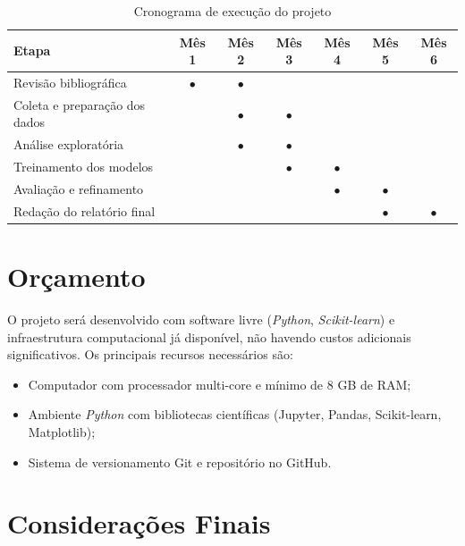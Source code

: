 \documentclass[
    article,
    12pt,
    oneside,
    a4paper,
    english,
    brazilian
    ]{abntex2}
\numberwithin{equation}{section}
\begin{document}
\begin{table}[htbp]
\centering
\caption{Cronograma de execução do projeto}
\label{tab:cronograma}
\small
\begin{tabular}{p{5.2cm}cccccc}
\toprule
\textbf{Etapa} & \textbf{Mês 1} & \textbf{Mês 2} & \textbf{Mês 3} & \textbf{Mês 4} & \textbf{Mês 5} & \textbf{Mês 6} \\
\midrule
Revisão bibliográfica         & $\bullet$ & $\bullet$ & & & & \\
Coleta e preparação dos dados & & $\bullet$ & $\bullet$ & & & \\
Análise exploratória          & & $\bullet$ & $\bullet$ & & & \\
Treinamento dos modelos       & & & $\bullet$ & $\bullet$ & & \\
Avaliação e refinamento       & & & & $\bullet$ & $\bullet$ & \\
Redação do relatório final    & & & & & $\bullet$ & $\bullet$ \\
\bottomrule
\end{tabular}
\vspace{2mm}
\end{table}

\section{Orçamento}

O projeto será desenvolvido com software livre (\textit{Python}, \textit{Scikit-learn}) e infraestrutura computacional já disponível, não havendo custos adicionais significativos. Os principais recursos necessários são:

\begin{itemize}
    \item Computador com processador multi-core e mínimo de 8 GB de RAM;
    \item Ambiente \textit{Python} com bibliotecas científicas (Jupyter, Pandas, Scikit-learn, Matplotlib);
    \item Sistema de versionamento Git e repositório no GitHub.
\end{itemize}

\section{Considerações Finais}
\end{document}
